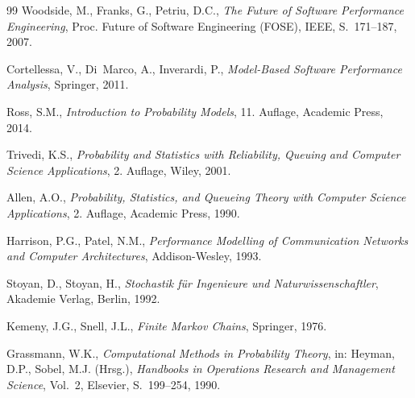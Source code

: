 ﻿\documentclass[a4paper,12pt]{scrreprt}
\theoremstyle{definition}
\begin{document}
\begin{thebibliography}{99}
	Woodside, M., Franks, G., Petriu, D.C.,
	\textit{The Future of Software Performance Engineering},
	Proc. Future of Software Engineering (FOSE),
	IEEE, S.~171--187, 2007.
	
	Cortellessa, V., Di~Marco, A., Inverardi, P.,
	\textit{Model-Based Software Performance Analysis},
	Springer, 2011.
	
	Ross, S.M.,
	\textit{Introduction to Probability Models},
	11. Auflage, Academic Press, 2014.
	
	Trivedi, K.S.,
	\textit{Probability and Statistics with Reliability, Queuing
		and Computer Science Applications},
	2. Auflage, Wiley, 2001.
	
	Allen, A.O.,
	\textit{Probability, Statistics, and Queueing Theory with
		Computer Science Applications},
	2. Auflage, Academic Press, 1990.
	
	Harrison, P.G., Patel, N.M.,
	\textit{Performance Modelling of Communication Networks and
		Computer Architectures},
	Addison-Wesley, 1993.
	
	Stoyan, D., Stoyan, H.,
	\textit{Stochastik für Ingenieure und Naturwissenschaftler},
	Akademie Verlag, Berlin, 1992.
	
	Kemeny, J.G., Snell, J.L.,
	\textit{Finite Markov Chains},
	Springer, 1976.
	
	Grassmann, W.K.,
	\textit{Computational Methods in Probability Theory},
	in: Heyman, D.P., Sobel, M.J. (Hrsg.),
	\textit{Handbooks in Operations Research and Management Science},
	Vol.~2, Elsevier, S.~199--254, 1990.
	
\end{thebibliography}
	
\end{document}
